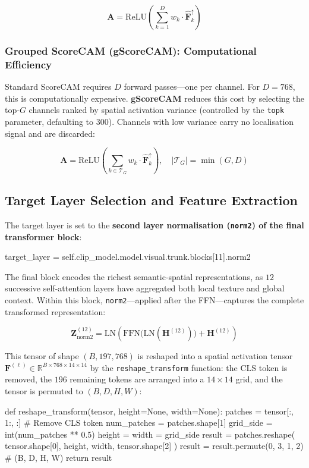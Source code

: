 \[
\mathbf{A} = \text{ReLU}\!\left(\sum_{k=1}^{D} w_k \cdot \hat{\mathbf{F}}_k^{\uparrow}\right)
\]

\subsubsection{Grouped ScoreCAM (gScoreCAM): Computational Efficiency}

Standard ScoreCAM requires $D$ forward passes—one per channel. For $D = 768$, this is computationally expensive. \textbf{gScoreCAM} reduces this cost by selecting the top-$G$ channels ranked by spatial activation variance (controlled by the \texttt{topk} parameter, defaulting to $300$). Channels with low variance carry no localisation signal and are discarded:

\[
\mathbf{A} = \text{ReLU}\!\left(\sum_{k \in \mathcal{T}_G} w_k \cdot \hat{\mathbf{F}}_k^{\uparrow}\right), \quad |\mathcal{T}_G| = \min(G, D)
\]

\subsection{Target Layer Selection and Feature Extraction}

 The target layer is set to the \textbf{second layer normalisation (\texttt{norm2}) of the final transformer block}:

\begin{pythoncode}
target_layer = self.clip_model.model.visual.trunk.blocks[11].norm2
\end{pythoncode}

The final block encodes the richest semantic-spatial representations, as $12$ successive self-attention layers have aggregated both local texture and global context. Within this block, \texttt{norm2}—applied after the FFN—captures the complete transformed representation:

\[
\mathbf{Z}^{(12)}_{\text{norm2}} = \text{LN}\!\left(\text{FFN}\!\bigl(\text{LN}(\mathbf{H}^{(12)})\bigr) + \mathbf{H}^{(12)}\right)
\]

This tensor of shape $(B, 197, 768)$ is reshaped into a spatial activation tensor $\mathbf{F}^{(\ell)} \in \mathbb{R}^{B \times 768 \times 14 \times 14}$ by the \texttt{reshape\_transform} function: the CLS token is removed, the $196$ remaining tokens are arranged into a $14 \times 14$ grid, and the tensor is permuted to $(B, D, H, W)$:

\begin{pythoncode}
def reshape_transform(tensor, height=None, width=None):
    patches = tensor[:, 1:, :]  # Remove CLS token
    num_patches = patches.shape[1]
    grid_side = int(num_patches ** 0.5)
    height = width = grid_side
    result = patches.reshape(
        tensor.shape[0], height, width, tensor.shape[2]
    )
    result = result.permute(0, 3, 1, 2)  # (B, D, H, W)
    return result
\end{pythoncode}

